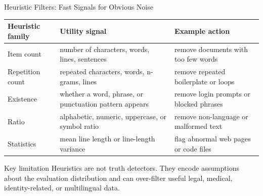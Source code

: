 \documentclass[aspectratio=169]{beamer}
\begin{document}

\begin{frame}{Heuristic Filters: Fast Signals for Obvious Noise}

\begin{center}
\begin{tabular}{p{}p{}p{}}
\toprule
\textbf{Heuristic family} & \textbf{Utility signal} & \textbf{Example action} \\
\midrule
Item count & number of characters, words, lines, sentences & remove documents with too few words \\
Repetition count & repeated characters, words, n-grams, lines & remove repeated boilerplate or loops \\
Existence & whether a word, phrase, or punctuation pattern appears & remove login prompts or blocked phrases \\
Ratio & alphabetic, numeric, uppercase, or symbol ratio & remove non-language or malformed text \\
Statistics & mean line length or line-length variance & flag abnormal web pages or code files \\
\bottomrule
\end{tabular}
\end{center}

\vspace{0.7em}

\begin{alertblock}{Key limitation}
Heuristics are not truth detectors. They encode assumptions about the evaluation distribution and can over-filter useful legal, medical, identity-related, or multilingual data.
\end{alertblock}

\end{frame}
\end{document}
